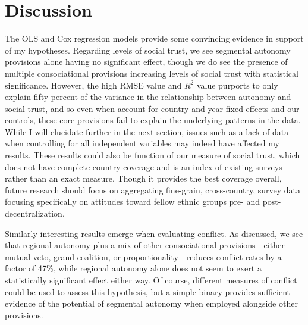 \documentclass[12pt]{article}
\begin{document}
\section{Discussion} 
The OLS and Cox regression models provide some convincing evidence in support of my hypotheses. Regarding levels of social trust, we see segmental autonomy provisions alone having no significant effect, though we do see the presence of multiple consociational provisions increasing levels of social trust with statistical significance. However, the high RMSE value and $R^2$ value purports to only explain fifty percent of the variance in the relationship between autonomy and social trust, and so even when account for country and year fixed-effects and our controls, these core provisions fail to explain the underlying patterns in the data. While I will elucidate further in the next section, issues such as a lack of data when controlling for all independent variables may indeed have affected my results. These results could also be function of our measure of social trust, which does not have complete country coverage and is an index of existing surveys rather than an exact measure. Though it provides the best coverage overall, future research should focus on aggregating fine-grain, cross-country, survey data focusing specifically on attitudes toward fellow ethnic groups pre- and post-decentralization. 

Similarly interesting results emerge when evaluating conflict. As discussed, we see that regional autonomy plus a mix of other consociational provisions---either mutual veto, grand coalition, or proportionality---reduces conflict rates by a factor of 47\%, while regional autonomy alone does not seem to exert a statistically significant effect either way. Of course, different measures of conflict could be used to assess this hypothesis, but a simple binary provides sufficient evidence of the potential of segmental autonomy when employed alongside other provisions.  
\end{document}
